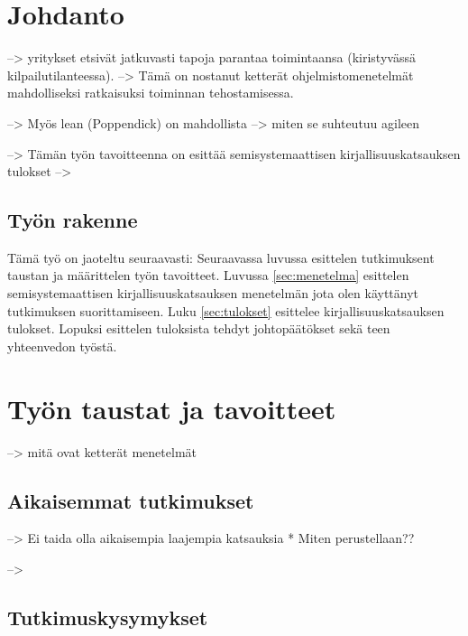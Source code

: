 
\section{Johdanto}

--> yritykset etsivät jatkuvasti tapoja parantaa toimintaansa (kiristyvässä kilpailutilanteessa). --> Tämä on nostanut ketterät ohjelmistomenetelmät mahdolliseksi ratkaisuksi toiminnan tehostamisessa.

--> Myös lean (Poppendick) on mahdollista --> miten se suhteutuu agileen

--> Tämän työn tavoitteenna on esittää semisystemaattisen kirjallisuuskatsauksen tulokset
--> 

\subsection{Työn rakenne}

Tämä työ on jaoteltu seuraavasti:
Seuraavassa luvussa esittelen tutkimuksent taustan ja määrittelen työn tavoitteet. Luvussa \ref{sec:menetelma} esittelen semisystemaattisen kirjallisuuskatsauksen menetelmän jota olen käyttänyt tutkimuksen suorittamiseen. Luku \ref{sec:tulokset} esittelee kirjallisuuskatsauksen tulokset. Lopuksi esittelen tuloksista tehdyt johtopäätökset sekä teen yhteenvedon työstä.



\section{Työn taustat ja tavoitteet}
\label{sec:tausta}

--> mitä ovat ketterät menetelmät


\subsection{Aikaisemmat tutkimukset}

--> Ei taida olla aikaisempia laajempia katsauksia
    * Miten perustellaan??
    
--> 

\subsection{Tutkimuskysymykset}




